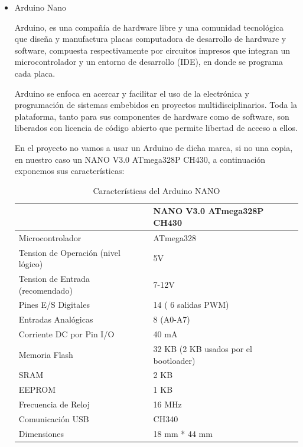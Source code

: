 \documentclass{pclass}
\begin{document}
\begin{itemize}
\begin{itemize}
			
			\item Arduino Nano
			
				Arduino, es una compañía de hardware libre y una comunidad tecnológica que diseña y manufactura placas computadora de desarrollo de hardware y software, compuesta respectivamente por circuitos impresos que integran un microcontrolador y un entorno de desarrollo (IDE), en donde se programa cada placa.
			
				Arduino se enfoca en acercar y facilitar el uso de la electrónica y programación de sistemas embebidos en proyectos multidisciplinarios. Toda la plataforma, tanto para sus componentes de hardware como de software, son liberados con licencia de código abierto que permite libertad de acceso a ellos.
				
				En el proyecto no vamos a usar un Arduino de dicha marca, si no una copia, en nuestro caso un NANO V3.0 ATmega328P CH430, a continuación exponemos sus características:
				
				\begin{table}[H]
					\begin{center}
						\begin{tabular}{|l|l|}
							\hline
							& NANO V3.0 ATmega328P CH430 \\
							\hline \hline
							Microcontrolador & ATmega328 \\ \hline
							Tension de Operación (nivel lógico) & 5V \\ \hline
							Tension de Entrada (recomendado) & 7-12V \\ \hline
							Pines E/S Digitales & 14 ( 6 salidas PWM) \\ \hline
							Entradas Analógicas & 8 (A0-A7) \\ \hline
							Corriente DC por Pin I/O & 40 mA\\ \hline
							Memoria Flash & 32 KB (2 KB usados por el bootloader) \\ \hline
							SRAM & 2 KB \\ \hline
							EEPROM & 1 KB \\ \hline
							Frecuencia de Reloj & 	16 MHz \\ \hline
							Comunicación USB & CH340 \\ \hline
							Dimensiones & 18 mm * 44 mm \\ \hline
						\end{tabular}
						\caption{Características del Arduino NANO}
						\label{tabla:arduino}
					\end{center}
				\end{table}
			

\end{itemize}
\end{itemize}
\end{document}
